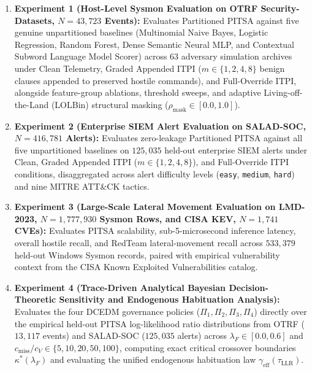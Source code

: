 \documentclass[11pt,a4paper]{article}
\let\oldtexttt\texttt
\renewcommand{\texttt}[1]{\textnormal{\oldtexttt{#1}}}
\begin{document}
\begin{enumerate}
  \item \textbf{Experiment 1 (Host-Level Sysmon Evaluation on OTRF Security-Datasets, $N = 43,723$ Events):} Evaluates Partitioned PITSA against five genuine unpartitioned baselines (Multinomial Naive Bayes, Logistic Regression, Random Forest, Dense Semantic Neural MLP, and Contextual Subword Language Model Scorer) across 63 adversary simulation archives under Clean Telemetry, Graded Appended ITPI ($m \in \{1, 2, 4, 8\}$ benign clauses appended to preserved hostile commands), and Full-Override ITPI, alongside feature-group ablations, threshold sweeps, and adaptive Living-off-the-Land (LOLBin) structural masking ($\rho_{\text{mask}} \in [0.0, 1.0]$).
  \item \textbf{Experiment 2 (Enterprise SIEM Alert Evaluation on SALAD-SOC, $N = 416,781$ Alerts):} Evaluates zero-leakage Partitioned PITSA against all five unpartitioned baselines on $125,035$ held-out enterprise SIEM alerts under Clean, Graded Appended ITPI ($m \in \{1, 2, 4, 8\}$), and Full-Override ITPI conditions, disaggregated across alert difficulty levels (\texttt{easy}, \texttt{medium}, \texttt{hard}) and nine MITRE ATT\&CK tactics.
  \item \textbf{Experiment 3 (Large-Scale Lateral Movement Evaluation on LMD-2023, $N = 1,777,930$ Sysmon Rows, and CISA KEV, $N = 1,741$ CVEs):} Evaluates PITSA scalability, sub-5-microsecond inference latency, overall hostile recall, and RedTeam lateral-movement recall across $533,379$ held-out Windows Sysmon records, paired with empirical vulnerability context from the CISA Known Exploited Vulnerabilities catalog.
  \item \textbf{Experiment 4 (Trace-Driven Analytical Bayesian Decision-Theoretic Sensitivity and Endogenous Habituation Analysis):} Evaluates the four DCEDM governance policies ($\Pi_1, \Pi_2, \Pi_3, \Pi_4$) directly over the empirical held-out PITSA log-likelihood ratio distributions from OTRF ($13,117$ events) and SALAD-SOC ($125,035$ alerts) across $\lambda_F \in [0.0, 0.6]$ and $c_{\text{miss}} / c_V \in \{5, 10, 20, 50, 100\}$, computing exact critical crossover boundaries $\kappa^*(\lambda_F)$ and evaluating the unified endogenous habituation law $\gamma_{\text{eff}}(\tau_{\text{LLR}})$.
\end{enumerate}
\end{document}
